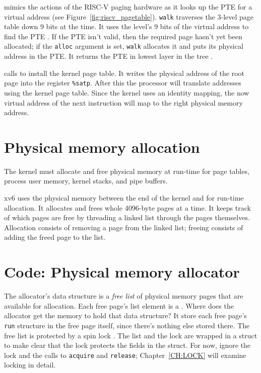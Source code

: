 mimics the actions of the RISC-V paging hardware as it
looks up the PTE for a virtual address (see
Figure~\ref{fig:riscv_pagetable}).
\lstinline{walk}
traverses the 3-level page table down 9 bits at the time.
It uses the level's 9 bits of the virtual address to find
the PTE
.
If the PTE isn't valid, then
the required page hasn't yet been allocated;
if the
\lstinline{alloc}
argument is set,
\lstinline{walk}
allocates it and puts its physical address in the PTE.
It returns the PTE in lowest layer in the tree
.

calls
to install the kernel page table.
It writes the physical address of the root page
into the register
\texttt{\%satp}.
After this the processor will translate addresses using the kernel
page table.  Since the kernel uses an identity mapping, the now
virtual address of the next instruction will map to the right physical
memory address.
\section{Physical memory allocation}

The kernel must allocate and free physical memory at run-time for
page tables,
process user memory,
kernel stacks,
and pipe buffers.

xv6 uses the physical memory between the end of the kernel and
for run-time allocation. It allocates and frees whole 4096-byte pages
at a time. It keeps track of which pages are free by threading a
linked list through the pages themselves. Allocation consists of
removing a page from the linked list; freeing consists of adding the
freed page to the list.
\section{Code: Physical memory allocator}

The allocator's data structure is a
\textit{free list}
of physical memory pages that are available
for allocation.
Each free page's list element is a
.
Where does the allocator get the memory
to hold that data structure?
It store each free page's
\lstinline{run}
structure in the free page itself,
since there's nothing else stored there.
The free list is
protected by a spin lock
.
The list and the lock are wrapped in a struct
to make clear that the lock protects the fields
in the struct.
For now, ignore the lock and the calls to
\lstinline{acquire}
and
\lstinline{release};
Chapter~\ref{CH:LOCK} will examine
locking in detail.

